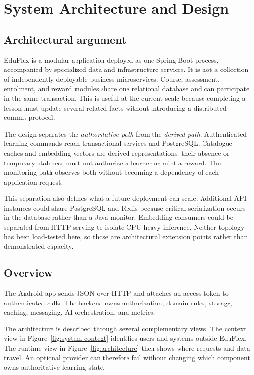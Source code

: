 \documentclass[12pt,a4paper,oneside]{report}
\begin{document}
\chapter{System Architecture and Design}
\section{Architectural argument}
EduFlex is a modular application deployed as one Spring Boot process, accompanied by
specialized data and infrastructure services. It is not a collection of independently
deployable business microservices. Course, assessment, enrolment, and reward modules
share one relational database and can participate in the same transaction. This is
useful at the current scale because completing a lesson must update several related
facts without introducing a distributed commit protocol.

The design separates the \emph{authoritative path} from the \emph{derived path}.
Authenticated learning commands reach transactional services and PostgreSQL. Catalogue
caches and embedding vectors are derived representations: their absence or temporary
staleness must not authorize a learner or mint a reward. The monitoring path observes
both without becoming a dependency of each application request.

\responsibilitydiagram

This separation also defines what a future deployment can scale. Additional API
instances could share PostgreSQL and Redis because critical serialization occurs in
the database rather than a Java monitor. Embedding consumers could be separated from
HTTP serving to isolate CPU-heavy inference. Neither topology has been load-tested
here, so those are architectural extension points rather than demonstrated capacity.

\section{Overview}
The Android app sends JSON over HTTP and attaches an access token to authenticated
calls. The backend owns authorization, domain rules, storage, caching, messaging,
AI orchestration, and metrics.

The architecture is described through several complementary views. The context view
in Figure~\ref{fig:system-context} identifies users and systems outside EduFlex. The
runtime view in Figure~\ref{fig:architecture} then shows where requests and data
travel. An optional provider can therefore fail without changing which component
owns authoritative learning state.
\end{document}
